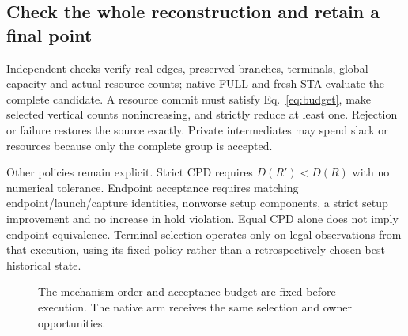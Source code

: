 \documentclass[conference,10pt]{IEEEtran}
\begin{document}
\subsection{Check the whole reconstruction and retain a final point}
Independent checks verify real edges, preserved branches, terminals, global capacity and actual resource counts; native FULL and fresh STA evaluate the complete candidate. A resource commit must satisfy Eq.~\ref{eq:budget}, make selected vertical counts nonincreasing, and strictly reduce at least one. Rejection or failure restores the source exactly. Private intermediates may spend slack or resources because only the complete group is accepted.

Other policies remain explicit. Strict CPD requires $D(R')<D(R)$ with no numerical tolerance. Endpoint acceptance requires matching endpoint/launch/capture identities, nonworse setup components, a strict setup improvement and no increase in hold violation. Equal CPD alone does not imply endpoint equivalence. Terminal selection operates only on legal observations from that execution, using its fixed policy rather than a retrospectively chosen best historical state.

\begin{figure}[t]
\centering\footnotesize
{}
\caption{The mechanism order and acceptance budget are fixed before execution. The native arm receives the same selection and owner opportunities.}
\label{fig:algorithm}
\end{figure}
\end{document}
